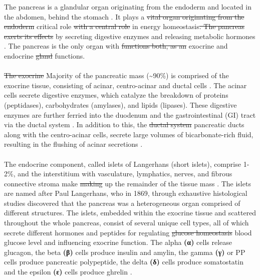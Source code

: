 The pancreas is a glandular organ originating from the endoderm and located in the abdomen, behind the stomach \textbf{\cite{shih_pancreas_2013}}. It plays a \st{vital organ originating from the endoderm} critical role \st{with a central role} in energy homeostasis\st{. The pancreas exerts its effects} by secreting digestive enzymes and releasing metabolic hormones \textbf{\cite{kimmel_molecular_2010, baron_single-cell_2016}}. The pancreas is the only organ with \st{functions both, as an} exocrine and endocrine \st{gland} functions.  
\\\\
\st{The exocrine} Majority of the pancreatic mass (\textasciitilde 90\%) is comprised of the exocrine tissue, consisting of acinar, centro-acinar and ductal cells \textbf{\cite{pandiri_overview_2014}}. The acinar cells secrete digestive enzymes, which catalyze the breakdown of proteins (peptidases), carbohydrates (amylases), and lipids (lipases). These digestive enzymes are further ferried into the duodenum and the gastrointestinal (GI) tract via the ductal system \textbf{\cite{shih_pancreas_2013, baron_single-cell_2016}}.  In addition to this, the \st{ductal system} pancreatic ducts along with the centro-acinar cells, secrete large volumes of bicarbonate-rich fluid, resulting in the flushing of acinar secretions \textbf{\cite{pandiri_overview_2014, low_pancreatic_2010}}. 
\\\\
The endocrine component, called islets of Langerhans (short islets), comprise 1-2\%, and the interstitium with vasculature, lymphatics, nerves, and fibrous connective stroma make \st{making} up the remainder of the tissue mass \textbf{\cite{pandiri_overview_2014}}. The islets are named after Paul Langerhans, who in 1869, through exhaustive histological studies discovered that the pancreas was a heterogeneous organ comprised of different structures. The islets, embedded within the exocrine tissue and scattered throughout the whole pancreas, consist of several unique cell types, all of which secrete different hormones and peptides for regulating \st{glucose homeostasis}  blood glucose level \textbf{\cite{shih_pancreas_2013, baron_single-cell_2016}} and influencing exocrine function.  The alpha \textbf{(α)} cells release glucagon, the beta \textbf{(β)} cells produce insulin and amylin, the gamma \textbf{(γ)} or PP cells produce pancreatic polypeptide, the delta \textbf{(δ)} cells produce somatostatin and the epsilon \textbf{(ε)} cells produce ghrelin \textbf{\cite{mastracci_endocrine_2012}}. 
